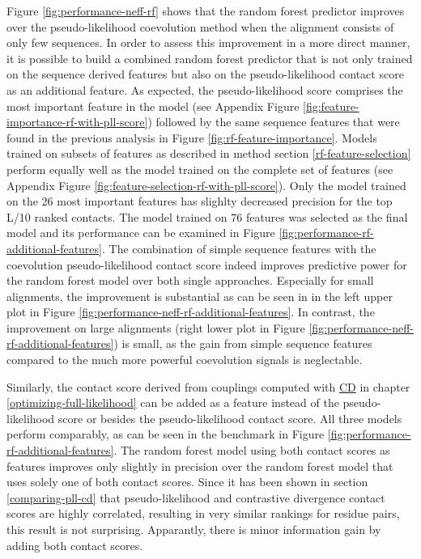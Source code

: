 \documentclass[11pt,a4paper,twoside]{book}
\theoremstyle{definition}
\theoremstyle{definition}
\theoremstyle{remark}
\begin{document}
Figure \ref{fig:performance-neff-rf} shows that the random forest
predictor improves over the pseudo-likelihood coevolution method when
the alignment consists of only few sequences. In order to assess this
improvement in a more direct manner, it is possible to build a combined
random forest predictor that is not only trained on the sequence derived
features but also on the pseudo-likelihood contact score as an
additional feature. As expected, the pseudo-likelihood score comprises
the most important feature in the model (see Appendix Figure
\ref{fig:feature-importance-rf-with-pll-score}) followed by the same
sequence features that were found in the previous analysis in Figure
\ref{fig:rf-feature-importance}. Models trained on subsets of features
as described in method section \ref{rf-feature-selection} perform
equally well as the model trained on the complete set of features (see
Appendix Figure \ref{fig:feature-selection-rf-with-pll-score}). Only the
model trained on the 26 most important features has slighlty decreased
precision for the top L/10 ranked contacts. The model trained on 76
features was selected as the final model and its performance can be
examined in Figure \ref{fig:performance-rf-additional-features}. The
combination of simple sequence features with the coevolution
pseudo-likelihood contact score indeed improves predictive power for the
random forest model over both single approaches. Especially for small
alignments, the improvement is substantial as can be seen in in the left
upper plot in Figure \ref{fig:performance-neff-rf-additional-features}.
In contrast, the improvement on large alignments (right lower plot in
Figure \ref{fig:performance-neff-rf-additional-features}) is small, as
the gain from simple sequence features compared to the much more
powerful coevolution signals is neglectable.

Similarly, the contact score derived from couplings computed with
\protect\hyperlink{abbrev}{CD} in chapter
\ref{optimizing-full-likelihood} can be added as a feature instead of
the pseudo-likelihood score or besides the pseudo-likelihood contact
score. All three models perform comparably, as can be seen in the
benchmark in Figure \ref{fig:performance-rf-additional-features}. The
random forest model using both contact scores as features improves only
slightly in precision over the random forest model that uses solely one
of both contact scores. Since it has been shown in section
\ref{comparing-pll-cd} that pseudo-likelihood and contrastive divergence
contact scores are highly correlated, resulting in very similar rankings
for residue pairs, this result is not surprising. Apparantly, there is
minor information gain by adding both contact scores.
\end{document}
